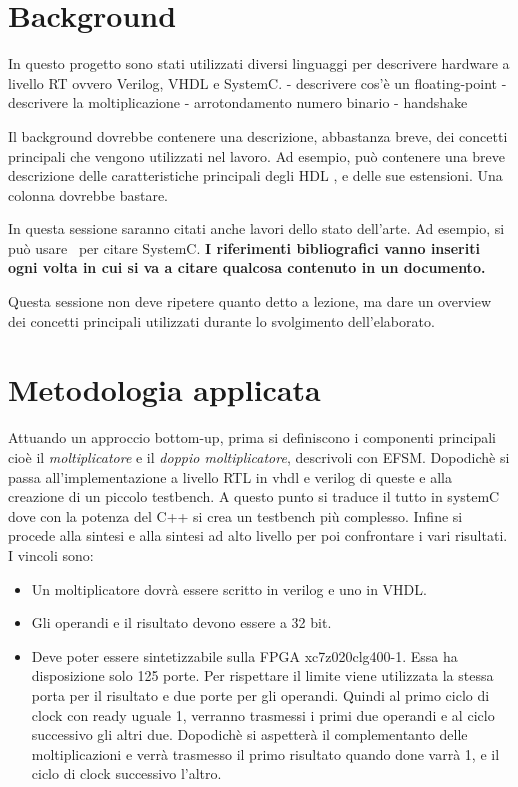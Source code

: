 \documentclass[]{IEEEtran}
\begin{document}
\section{Background}
In questo progetto sono stati utilizzati diversi linguaggi per descrivere hardware a livello RT ovvero Verilog, VHDL e SystemC. 
- descrivere cos'è un floating-point
- descrivere la moltiplicazione
- arrotondamento numero binario
- handshake

Il background dovrebbe contenere una descrizione, abbastanza breve, dei concetti principali che vengono utilizzati nel lavoro. Ad esempio, può contenere una breve descrizione delle caratteristiche principali degli HDL , e delle sue estensioni. Una colonna dovrebbe bastare.

In questa sessione saranno citati anche lavori dello stato dell'arte. Ad esempio, si può usare~\cite{SystemC} per citare SystemC. \textbf{I riferimenti bibliografici vanno inseriti ogni volta in cui si va a citare qualcosa contenuto in un documento.}

Questa sessione non deve ripetere quanto detto a lezione, ma dare un overview dei concetti principali utilizzati durante lo svolgimento dell'elaborato.


\section{Metodologia applicata}
Attuando un approccio bottom-up, prima si definiscono i componenti principali cioè il {\it moltiplicatore} e il {\it doppio moltiplicatore}, descrivoli con EFSM. Dopodichè si passa all'implementazione a livello RTL in vhdl e verilog di queste e alla creazione di un piccolo testbench. A questo punto si traduce il tutto in systemC dove con la potenza del C++ si crea un testbench più complesso. Infine si procede alla sintesi e alla sintesi ad alto livello per poi confrontare i vari risultati.\\

I vincoli sono:
\begin{itemize}
\item Un moltiplicatore dovrà essere scritto in verilog e uno in VHDL.
\item Gli operandi e il risultato devono essere a 32 bit.
\item Deve poter essere sintetizzabile sulla FPGA xc7z020clg400-1. Essa ha disposizione solo 125 porte. Per rispettare il limite viene utilizzata la stessa porta per il risultato e due porte per gli operandi. Quindi al primo ciclo di clock con ready uguale 1, verranno trasmessi i primi due operandi e al ciclo successivo gli altri due. Dopodichè si aspetterà il complementanto delle moltiplicazioni e verrà trasmesso il primo risultato quando done varrà 1, e il ciclo di clock successivo l'altro.
\end{itemize}
\end{document}

